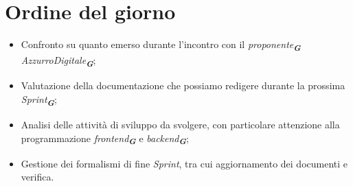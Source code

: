 

\section{Ordine del giorno}

\begin{itemize}
    \item Confronto su quanto emerso durante l'incontro con il \emph{proponente}\textsubscript{\textit{\textbf{G}}} \emph{AzzurroDigitale}\textsubscript{\textit{\textbf{G}}};
    \item Valutazione della documentazione che possiamo redigere durante la prossima \emph{Sprint}\textsubscript{\textit{\textbf{G}}};
    \item Analisi delle attività di sviluppo da svolgere, con particolare attenzione alla programmazione \emph{frontend}\textsubscript{\textit{\textbf{G}}} e \emph{backend}\textsubscript{\textit{\textbf{G}}};
    \item Gestione dei formalismi di fine \emph{Sprint}, tra cui aggiornamento dei documenti e verifica.
\end{itemize}